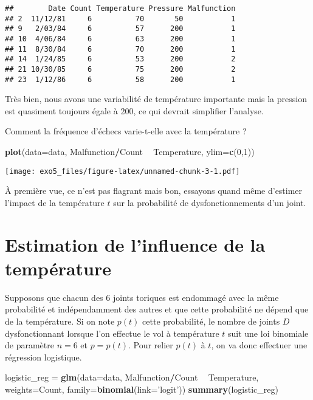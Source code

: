 \documentclass[]{article}
\newenvironment{Shaded}{\begin{snugshade}}{\end{snugshade}}
\newcommand{\DataTypeTok}[1]{\textcolor[rgb]{0.13,0.29,0.53}{#1}}
\newcommand{\DecValTok}[1]{\textcolor[rgb]{0.00,0.00,0.81}{#1}}
\newcommand{\KeywordTok}[1]{\textcolor[rgb]{0.13,0.29,0.53}{\textbf{#1}}}
\newcommand{\NormalTok}[1]{#1}
\newcommand{\OperatorTok}[1]{\textcolor[rgb]{0.81,0.36,0.00}{\textbf{#1}}}
\newcommand{\StringTok}[1]{\textcolor[rgb]{0.31,0.60,0.02}{#1}}
\begin{document}
\begin{verbatim}
##        Date Count Temperature Pressure Malfunction
## 2  11/12/81     6          70       50           1
## 9   2/03/84     6          57      200           1
## 10  4/06/84     6          63      200           1
## 11  8/30/84     6          70      200           1
## 14  1/24/85     6          53      200           2
## 21 10/30/85     6          75      200           2
## 23  1/12/86     6          58      200           1
\end{verbatim}

Très bien, nous avons une variabilité de température importante mais la
pression est quasiment toujours égale à 200, ce qui devrait simplifier
l'analyse.

Comment la fréquence d'échecs varie-t-elle avec la température ?

\begin{Shaded}
\begin{Highlighting}[]
\KeywordTok{plot}\NormalTok{(}\DataTypeTok{data=}\NormalTok{data, Malfunction}\OperatorTok{/}\NormalTok{Count }\OperatorTok{~}\StringTok{ }\NormalTok{Temperature, }\DataTypeTok{ylim=}\KeywordTok{c}\NormalTok{(}\DecValTok{0}\NormalTok{,}\DecValTok{1}\NormalTok{))}
\end{Highlighting}
\end{Shaded}

\texttt{[image: exo5\_files/figure-latex/unnamed-chunk-3-1.pdf]}

À première vue, ce n'est pas flagrant mais bon, essayons quand même
d'estimer l'impact de la température \(t\) sur la probabilité de
dysfonctionnements d'un joint.

\hypertarget{estimation-de-linfluence-de-la-temperature}{%
\section{Estimation de l'influence de la
température}\label{estimation-de-linfluence-de-la-temperature}}

Supposons que chacun des 6 joints toriques est endommagé avec la même
probabilité et indépendamment des autres et que cette probabilité ne
dépend que de la température. Si on note \(p(t)\) cette probabilité, le
nombre de joints \(D\) dysfonctionnant lorsque l'on effectue le vol à
température \(t\) suit une loi binomiale de paramètre \(n=6\) et
\(p=p(t)\). Pour relier \(p(t)\) à \(t\), on va donc effectuer une
régression logistique.

\begin{Shaded}
\begin{Highlighting}[]
\NormalTok{logistic_reg =}\StringTok{ }\KeywordTok{glm}\NormalTok{(}\DataTypeTok{data=}\NormalTok{data, Malfunction}\OperatorTok{/}\NormalTok{Count }\OperatorTok{~}\StringTok{ }\NormalTok{Temperature, }\DataTypeTok{weights=}\NormalTok{Count, }
                   \DataTypeTok{family=}\KeywordTok{binomial}\NormalTok{(}\DataTypeTok{link=}\StringTok{'logit'}\NormalTok{))}
\KeywordTok{summary}\NormalTok{(logistic_reg)}
\end{Highlighting}
\end{Shaded}
\end{document}
